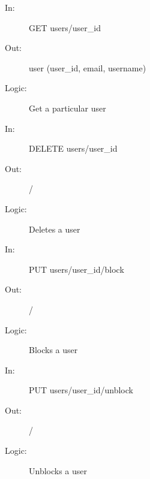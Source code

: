 \documentclass{article}
\begin{document}
\begin{description}
\begin{description}
    \end{description}
    \begin{description}
        \item[In:] GET users/user\_id
        \item[Out:] user (user\_id, email, username)
        \item[Logic:] Get a particular user
        \item[]
    \end{description}
    \begin{description}
        \item[In:] DELETE users/user\_id
        \item[Out:] /
        \item[Logic:] Deletes a user
        \item[]
    \end{description}
    \begin{description}
        \item[In:] PUT users/user\_id/block
        \item[Out:] /
        \item[Logic:] Blocks a user
        \item[]
    \end{description}
    \begin{description}
        \item[In:] PUT users/user\_id/unblock
        \item[Out:] /
        \item[Logic:] Unblocks a user
    \end{description}
\end{description}
\end{document}
